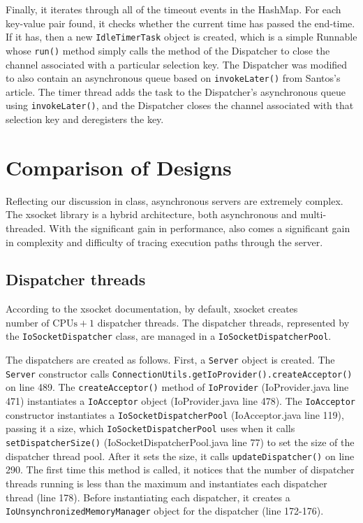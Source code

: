 \documentclass[letterpaper,12pt]{article}
\begin{document}
Finally, it iterates through all of the timeout events in the HashMap. For each key-value pair found, it checks whether the current time has passed the end-time. If it has, then a new \texttt{IdleTimerTask} object is created, which is a simple Runnable whose \texttt{run()} method simply calls the method of the Dispatcher to close the channel associated with a particular selection key. The Dispatcher was modified to also contain an asynchronous queue based on \texttt{invokeLater()} from Santos's article. The timer thread adds the task to the Dispatcher's asynchronous queue using \texttt{invokeLater()}, and the Dispatcher closes the channel associated with that selection key and deregisters the key.


\section{Comparison of Designs}

Reflecting our discussion in class, asynchronous servers are extremely complex. The xsocket library is a hybrid architecture, both asynchronous and multi-threaded. With the significant gain in performance, also comes a significant gain in complexity and difficulty of tracing execution paths through the server.

\subsection{Dispatcher threads}

According to the xsocket documentation, by default, xsocket creates $\text{number of CPUs} + 1$ dispatcher threads. The dispatcher threads, represented by the \texttt{IoSocketDispatcher} class, are managed in a \texttt{IoSocketDispatcherPool}.

The dispatchers are created as follows. First, a \texttt{Server} object is created. The \texttt{Server} constructor calls \texttt{ConnectionUtils.getIoProvider().createAcceptor()} on line 489. The \texttt{createAcceptor()} method of \texttt{IoProvider} (IoProvider.java line 471) instantiates a \texttt{IoAcceptor} object (IoProvider.java line 478). The \texttt{IoAcceptor} constructor instantiates a \texttt{IoSocketDispatcherPool} (IoAcceptor.java line 119), passing it a size, which \texttt{IoSocketDispatcherPool} uses when it calls \texttt{setDispatcherSize()} (IoSocketDispatcherPool.java line 77) to set the size of the dispatcher thread pool. After it sets the size, it calls \texttt{updateDispatcher()} on line 290. The first time this method is called, it notices that the number of dispatcher threads running is less than the maximum and instantiates each dispatcher thread (line 178). Before instantiating each dispatcher, it creates a \texttt{IoUnsynchronizedMemoryManager} object for the dispatcher (line 172-176).
\end{document}
